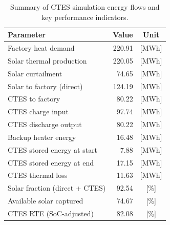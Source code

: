 \renewcommand{\arraystretch}{1.2}
\begin{table}[h]
\centering
\begin{tabular}{l|r c}
\hline
Parameter & Value & Unit \\
\hline
Factory heat demand & 220.91 & [MWh] \\
Solar thermal production & 220.05 & [MWh] \\
Solar curtailment & 74.65 & [MWh] \\
Solar to factory (direct) & 124.19 & [MWh] \\
CTES to factory & 80.22 & [MWh] \\
CTES charge input & 97.74 & [MWh] \\
CTES discharge output & 80.22 & [MWh] \\
Backup heater energy & 16.48 & [MWh] \\
CTES stored energy at start & 7.88 & [MWh] \\
CTES stored energy at end & 17.15 & [MWh] \\
CTES thermal loss & 11.63 & [MWh] \\
\hline
Solar fraction (direct + CTES) & 92.54 & [\%] \\
Available solar captured & 74.67 & [\%] \\
CTES RTE (SoC-adjusted) & 82.08 & [\%] \\
\hline
\end{tabular}
\caption{Summary of CTES simulation energy flows and key performance indicators.}
\label{tab:ctes-simulation-summary}
\end{table}
